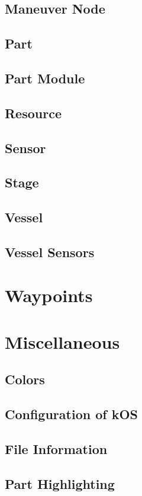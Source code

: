 		\subsection{Maneuver Node}
		\subsection{Part}
		\subsection{Part Module}
		\subsection{Resource}
		\subsection{Sensor}
		\subsection{Stage}
		\subsection{Vessel}
		\subsection{Vessel Sensors}
	\section{Waypoints}
	\section{Miscellaneous}
		\subsection{Colors}
		\subsection{Configuration of kOS}
		\subsection{File Information}
		\subsection{Part Highlighting}

